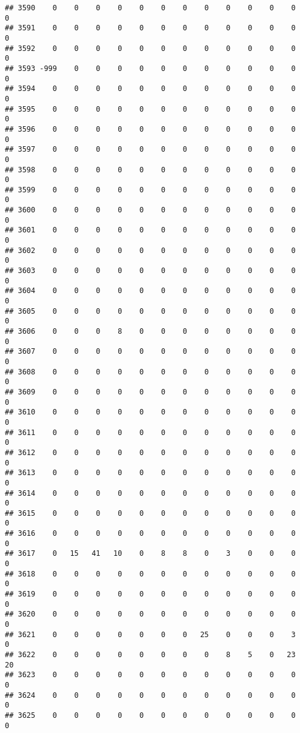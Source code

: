 \documentclass[]{article}
\begin{document}
\begin{verbatim}
## 3590    0    0    0    0    0    0    0    0    0    0    0    0    0
## 3591    0    0    0    0    0    0    0    0    0    0    0    0    0
## 3592    0    0    0    0    0    0    0    0    0    0    0    0    0
## 3593 -999    0    0    0    0    0    0    0    0    0    0    0    0
## 3594    0    0    0    0    0    0    0    0    0    0    0    0    0
## 3595    0    0    0    0    0    0    0    0    0    0    0    0    0
## 3596    0    0    0    0    0    0    0    0    0    0    0    0    0
## 3597    0    0    0    0    0    0    0    0    0    0    0    0    0
## 3598    0    0    0    0    0    0    0    0    0    0    0    0    0
## 3599    0    0    0    0    0    0    0    0    0    0    0    0    0
## 3600    0    0    0    0    0    0    0    0    0    0    0    0    0
## 3601    0    0    0    0    0    0    0    0    0    0    0    0    0
## 3602    0    0    0    0    0    0    0    0    0    0    0    0    0
## 3603    0    0    0    0    0    0    0    0    0    0    0    0    0
## 3604    0    0    0    0    0    0    0    0    0    0    0    0    0
## 3605    0    0    0    0    0    0    0    0    0    0    0    0    0
## 3606    0    0    0    8    0    0    0    0    0    0    0    0    0
## 3607    0    0    0    0    0    0    0    0    0    0    0    0    0
## 3608    0    0    0    0    0    0    0    0    0    0    0    0    0
## 3609    0    0    0    0    0    0    0    0    0    0    0    0    0
## 3610    0    0    0    0    0    0    0    0    0    0    0    0    0
## 3611    0    0    0    0    0    0    0    0    0    0    0    0    0
## 3612    0    0    0    0    0    0    0    0    0    0    0    0    0
## 3613    0    0    0    0    0    0    0    0    0    0    0    0    0
## 3614    0    0    0    0    0    0    0    0    0    0    0    0    0
## 3615    0    0    0    0    0    0    0    0    0    0    0    0    0
## 3616    0    0    0    0    0    0    0    0    0    0    0    0    0
## 3617    0   15   41   10    0    8    8    0    3    0    0    0    0
## 3618    0    0    0    0    0    0    0    0    0    0    0    0    0
## 3619    0    0    0    0    0    0    0    0    0    0    0    0    0
## 3620    0    0    0    0    0    0    0    0    0    0    0    0    0
## 3621    0    0    0    0    0    0    0   25    0    0    0    3    0
## 3622    0    0    0    0    0    0    0    0    8    5    0   23   20
## 3623    0    0    0    0    0    0    0    0    0    0    0    0    0
## 3624    0    0    0    0    0    0    0    0    0    0    0    0    0
## 3625    0    0    0    0    0    0    0    0    0    0    0    0    0

\end{verbatim}
\end{document}
